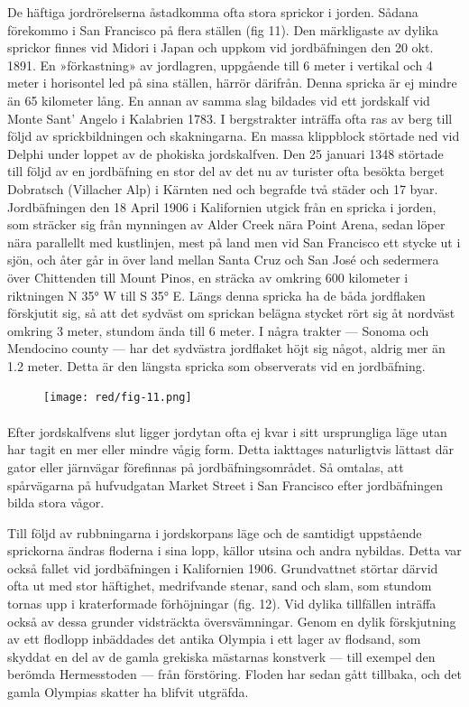 \documentclass[a4paper, 12pt, oneside, swedish]{article}
\begin{document}
De häftiga jordrörelserna åstadkomma ofta stora sprickor i jorden. Sådana förekommo i San Francisco på flera ställen (fig 11). Den märkligaste av dylika sprickor finnes vid Midori i Japan och uppkom vid jordbäfningen den 20 okt. 1891. En »förkastning» av jordlagren, uppgående till 6 meter i vertikal och 4 meter i horisontel led på sina ställen, härrör därifrån. Denna spricka är ej mindre än 65 kilometer lång. En annan av samma slag bildades vid ett jordskalf vid Monte Sant' Angelo i Kalabrien 1783. I bergstrakter inträffa ofta ras av berg till följd av sprickbildningen och skakningarna. En massa klippblock störtade ned vid Delphi under loppet av de phokiska jordskalfven. Den 25 januari 1348 störtade till följd av en jordbäfning en stor del av det nu av turister ofta besökta berget Dobratsch (Villacher Alp) i Kärnten ned och begrafde två städer och 17 byar. Jordbäfningen den 18 April 1906 i Kalifornien utgick från en spricka i jorden, som sträcker sig från mynningen av Alder Creek nära Point Arena, sedan löper nära parallellt med kustlinjen, mest på land men vid San Francisco ett stycke ut i sjön, och åter går in över land mellan Santa Cruz och San José och sedermera över Chittenden till Mount Pinos, en sträcka av omkring 600 kilometer i riktningen N 35° W till S 35° E. Längs denna spricka ha de båda jordflaken förskjutit sig, så att det sydväst om sprickan belägna stycket rört sig åt nordväst omkring 3 meter, stundom ända till 6 meter. I några trakter --- Sonoma och Mendocino county --- har det sydvästra jordflaket höjt sig något, aldrig mer än 1.2 meter. Detta är den längsta spricka som observerats vid en jordbäfning.

\begin{figure}[H]
\centering
\texttt{[image: red/fig-11.png]}
\caption{}
\end{figure}
\paragraph{}
Efter jordskalfvens slut ligger jordytan ofta ej kvar i sitt ursprungliga läge utan har tagit en mer eller mindre vågig form. Detta iakttages naturligtvis lättast där gator eller järnvägar förefinnas på jordbäfningsområdet. Så omtalas, att spårvägarna på hufvudgatan Market Street i San Francisco efter jordbäfningen bilda stora vågor.

Till följd av rubbningarna i jordskorpans läge och de samtidigt uppstående sprickorna ändras floderna i sina lopp, källor utsina och andra nybildas. Detta var också fallet vid jordbäfningen i Kalifornien 1906. Grundvattnet störtar därvid ofta ut med stor häftighet, medrifvande stenar, sand och slam, som stundom tornas upp i kraterformade förhöjningar (fig. 12). Vid dylika tillfällen inträffa också av dessa grunder vidsträckta översvämningar. Genom en dylik förskjutning av ett flodlopp inbäddades det antika Olympia i ett lager av flodsand, som skyddat en del av de gamla grekiska mästarnas konstverk --- till exempel den berömda Hermesstoden --- från förstöring. Floden har sedan gått tillbaka, och det gamla Olympias skatter ha blifvit utgräfda.
\end{document}

